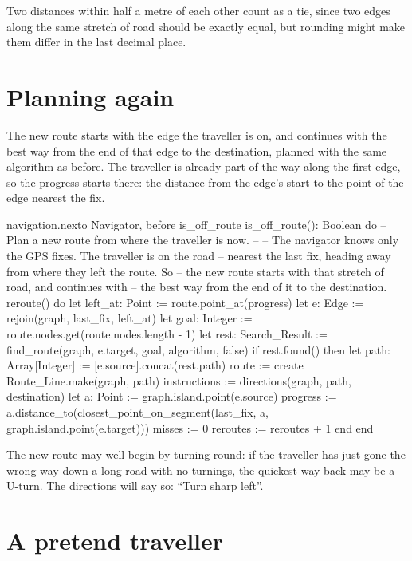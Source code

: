 Two distances within half a metre of each other count as a tie, since two
edges along the same stretch of road should be exactly equal, but rounding
might make them differ in the last decimal place.

\section{Planning again}

The new route starts with the edge the traveller is on, and continues with
the best way from the end of that edge to the destination, planned with
the same algorithm as before. The traveller is already part of the way
along the first edge, so the progress starts there: the distance from the
edge's start to the point of the edge nearest the fix.

\begin{addbefore}{navigation.nex}{to Navigator, before is_off_route}{  is_off_route(): Boolean do}
  -- Plan a new route from where the traveller is now.
  --
  -- The navigator knows only the GPS fixes. The traveller is on the road
  -- nearest the last fix, heading away from where they left the route. So
  -- the new route starts with that stretch of road, and continues with
  -- the best way from the end of it to the destination.
  reroute() do
    let left_at: Point := route.point_at(progress)
    let e: Edge := rejoin(graph, last_fix, left_at)
    let goal: Integer := route.nodes.get(route.nodes.length - 1)
    let rest: Search_Result := find_route(graph, e.target, goal, algorithm, false)
    if rest.found() then
      let path: Array[Integer] := [e.source].concat(rest.path)
      route := create Route_Line.make(graph, path)
      instructions := directions(graph, path, destination)
      let a: Point := graph.island.point(e.source)
      progress := a.distance_to(closest_point_on_segment(last_fix, a,
        graph.island.point(e.target)))
      misses := 0
      reroutes := reroutes + 1
    end
  end
\end{addbefore}

The new route may well begin by turning round: if the traveller has just
gone the wrong way down a long road with no turnings, the quickest way back
may be a U-turn. The directions will say so: ``Turn sharp left''.

\section{A pretend traveller}


